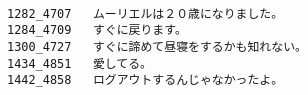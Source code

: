 \documentclass[a4paper,12pt]{article}
\begin{document}
\begin{CJK}{UTF8}{min}
\begin{verbatim}

1282_4707	ムーリエルは２０歳になりました。
1284_4709	すぐに戻ります。
1300_4727	すぐに諦めて昼寝をするかも知れない。
1434_4851	愛してる。
1442_4858	ログアウトするんじゃなかったよ。

\end{verbatim}
\end{CJK}
\end{document}
